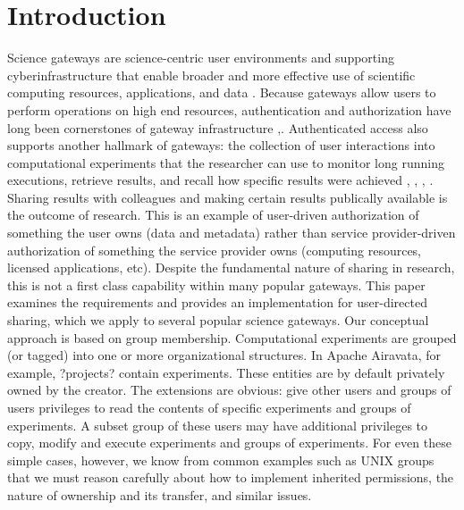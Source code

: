 \documentclass[sigconf]{acmart}
\begin{document}


\maketitle

\section{Introduction}

Science gateways are science-centric user environments and supporting cyberinfrastructure that enable broader and more effective use of scientific computing resources, applications, and data \cite{gatewaySurvey2015}. Because gateways allow users to perform operations on high end resources, authentication and authorization have long been cornerstones of gateway infrastructure \cite{airavataSecurity2016},\cite{welch2007aaaa}. Authenticated access also supports another hallmark of gateways: the collection of user interactions into computational experiments that the researcher can use to monitor long running executions, retrieve results, and recall how specific results were achieved \cite{ultrascanAiravata2014}, \cite{cipres2010}, \cite{nsg2013}, \cite{seagridCommunity2016}. 
Sharing results with colleagues and making certain results publically available is the outcome of research. This is an example of user-driven authorization of something the user owns (data and metadata) rather than service provider-driven authorization of something the service provider owns (computing resources, licensed applications, etc).  Despite the fundamental nature of sharing in research, this is not a first class capability within many popular gateways. This paper examines the requirements and provides an implementation for user-directed sharing, which we apply to several popular science gateways. 
Our conceptual approach is based on group membership. Computational experiments are grouped (or tagged) into one or more organizational structures. In Apache Airavata, for example, ?projects? contain experiments. These entities are by default privately owned by the creator.  The extensions are obvious: give other users and groups of users privileges to read the contents of specific experiments and groups of experiments. A subset group of these users may have additional privileges to copy, modify and execute experiments and groups of experiments. For even these simple cases, however, we know from common examples such as UNIX groups that we must reason carefully about how to implement inherited permissions, the nature of ownership and its transfer, and similar issues.
\end{document}
